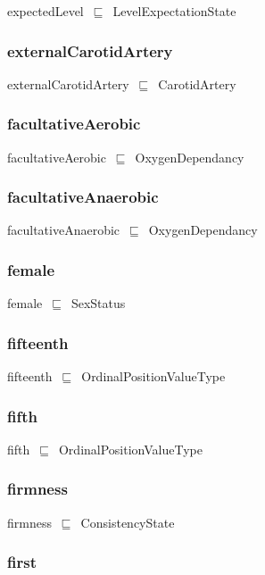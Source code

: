 \documentclass{article}
\begin{document}
expectedLevel~\ensuremath{\sqsubseteq}~LevelExpectationState~

\subsubsection*{externalCarotidArtery}

externalCarotidArtery~\ensuremath{\sqsubseteq}~CarotidArtery~

\subsubsection*{facultativeAerobic}

facultativeAerobic~\ensuremath{\sqsubseteq}~OxygenDependancy~

\subsubsection*{facultativeAnaerobic}

facultativeAnaerobic~\ensuremath{\sqsubseteq}~OxygenDependancy~

\subsubsection*{female}

female~\ensuremath{\sqsubseteq}~SexStatus~

\subsubsection*{fifteenth}

fifteenth~\ensuremath{\sqsubseteq}~OrdinalPositionValueType~

\subsubsection*{fifth}

fifth~\ensuremath{\sqsubseteq}~OrdinalPositionValueType~

\subsubsection*{firmness}

firmness~\ensuremath{\sqsubseteq}~ConsistencyState~

\subsubsection*{first}
\end{document}
